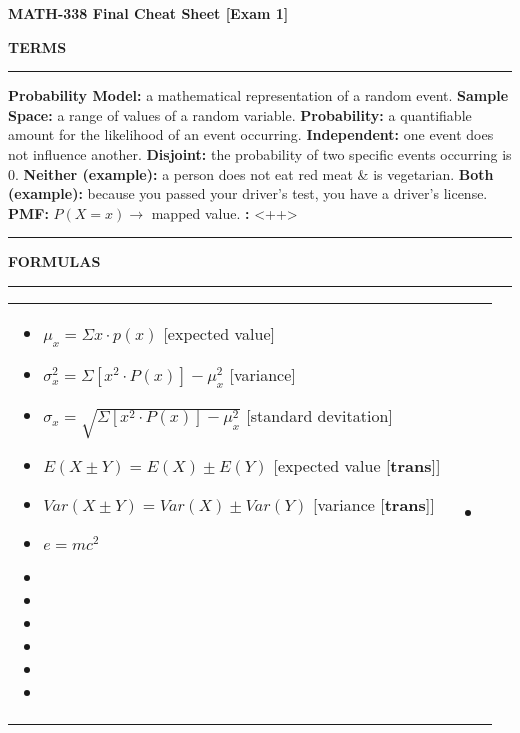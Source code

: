 \documentclass[6pt]{article}
\newcommand{\HL}{\par\noindent\rule{\textwidth}{0.4pt}}
\begin{document}
\begin{footnotesize}

\begin{center}
\textbf{MATH-338 Final Cheat Sheet [Exam 1]}
\end{center}

\textbf{TERMS}


\HL

\textbf{Probability Model:} a mathematical representation of a random event. 
\textbf{Sample Space:} a range of values of a random variable. 
\textbf{Probability:} a quantifiable amount for the likelihood of an event occurring. 
\textbf{Independent:} one event does not influence another.
\textbf{Disjoint:} the probability of two specific events occurring is 0.
\textbf{Neither (example):} a person does not eat red meat \& is vegetarian.
\textbf{Both (example):} because you passed your driver's test, you have a driver's license.
\textbf{PMF:} $P(X = x) \rightarrow$ mapped value.
\textbf{:} <++>

\HL

\textbf{FORMULAS}

\HL


\begin{tabular}{l | l}

\parbox{0.5\textwidth}{

\begin{itemize}

\item $\mu_{x} = \Sigma x \cdot p(x)$ [expected value]
\item $\sigma^{2}_{x} = \Sigma [x^{2} \cdot P(x)] - \mu^{2}_{x}$ [variance]
\item $\sigma_{x} = \sqrt{\Sigma [x^{2} \cdot P(x)] - \mu^{2}_{x}}$ [standard devitation]
\item $E(X \pm Y) = E(X) \pm E(Y)$ [expected value [\textbf{trans}]]
\item $Var(X \pm Y) = Var(X) \pm Var(Y)$ [variance [\textbf{trans}]]
\item $e = mc^{2}$
\item <++>
\item <++>
\item <++>
\item <++>
\item <++>
\item <++>
\end{itemize}

}

&

\parbox{0.5\textwidth}{
\begin{flushright}
\begin{itemize}

\item <++>

\end{itemize}
\end{flushright}
}

\end{tabular}
\end{footnotesize}
\end{document}
